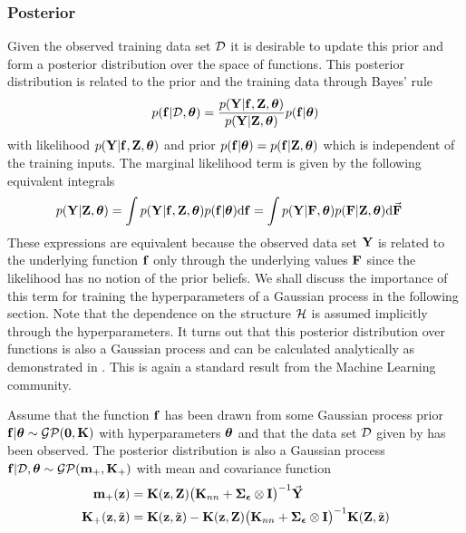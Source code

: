 \subsubsection{Posterior}
Given the observed training data set $\mathcal{D}$ it is desirable to update this prior and form a posterior distribution over the space of functions. This posterior distribution is related to the prior and the training data through Bayes' rule
\begin{equation}
p(\mathbf{f}|\mathcal{D},\boldsymbol{\theta}) = \frac{p(\mathbf{Y}|\mathbf{f},\mathbf{Z},\boldsymbol{\theta})}{p(\mathbf{Y}|\mathbf{Z},\boldsymbol{\theta})} p(\mathbf{f}|\boldsymbol{\theta})
\label{eqn:gpbayes}
\end{equation}
with likelihood $p(\mathbf{Y}|\mathbf{f},\mathbf{Z},\boldsymbol{\theta})$ and prior $p(\mathbf{f}|\boldsymbol{\theta})=p(\mathbf{f}|\mathbf{Z},\boldsymbol{\theta})$ which is independent of the training inputs. The marginal likelihood term is given by the following equivalent integrals
\begin{align}
p(\mathbf{Y}|\mathbf{Z},\boldsymbol{\theta}) &= \int p(\mathbf{Y}|\mathbf{f},\mathbf{Z},\boldsymbol{\theta})p(\mathbf{f}|\boldsymbol{\theta})\mathrm{d}\mathbf{f} 
= \int p(\mathbf{Y}|\mathbf{F},\boldsymbol{\theta})p(\mathbf{F}|\mathbf{Z},\boldsymbol{\theta})\mathrm{d}\vec{\mathbf{F}}
\label{eqn:marlik}
\end{align}
These expressions are equivalent because the observed data set $\mathbf{Y}$ is related to the underlying function $\mathbf{f}$ only through the underlying values $\mathbf{F}$ since the likelihood has no notion of the prior beliefs. We shall discuss the importance of this term for training the hyperparameters of a Gaussian process in the following section. Note that the dependence on the structure $\mathcal{H}$ is assumed implicitly through the hyperparameters. It turns out that this posterior distribution over functions is also a Gaussian process and can be calculated analytically as demonstrated in . This is again a standard result from the Machine Learning community.






\begin{theo} \label{theo:GPpost}
Assume that the function $\mathbf{f}$ has been drawn from some Gaussian process prior $\mathbf{f}|\boldsymbol{\theta} \sim \mathcal{GP}(\mathbf{0},\mathbf{K})$ with hyperparameters $\boldsymbol{\theta}$ and that the data set $\mathcal{D}$ given by  has been observed. The posterior distribution is also a Gaussian process $\mathbf{f}|\mathcal{D},\boldsymbol{\theta} \sim \mathcal{GP}(\mathbf{m}_+,\mathbf{K}_+)$ with mean and covariance function
\begin{align}
\mathbf{m}_{+}(\mathbf{z}) &= \mathbf{K}(\mathbf{z},\mathbf{Z}) \big(\mathbf{K}_{nn}+\boldsymbol{\Sigma}_{\boldsymbol{\epsilon}}\otimes\mathbf{I}\big)^{-1} \vec{\mathbf{Y}}  \label{eqn:gpmean} \\
\mathbf{K}_{+}(\mathbf{z},\tilde{\mathbf{z}}) &= \mathbf{K}(\mathbf{z},\tilde{\mathbf{z}}) - 
\mathbf{K}(\mathbf{z},\mathbf{Z}) \big(\mathbf{K}_{nn}+\boldsymbol{\Sigma}_{\boldsymbol{\epsilon}}\otimes\mathbf{I}\big)^{-1}\mathbf{K}(\mathbf{Z},\tilde{\mathbf{z}}) \label{eqn:gpvar}
\end{align}
\espa
\end{theo}

